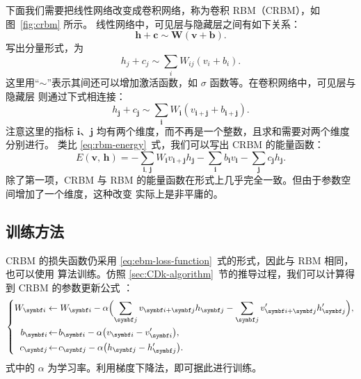 下面我们需要把线性网络改变成卷积网络，称为卷积 RBM（CRBM），如图~\ref{fig:crbm} 所示。
线性网络中，可见层与隐藏层之间有如下关系：
\begin{equation}
  \bm{h}+\bm{c} \sim \bm{W} (\bm{v}+\bm{b}).
\end{equation}
写出分量形式，为
\begin{equation}
  h_j+c_j \sim \sum_i W_{ij} (v_i+b_i).
\end{equation}
这里用“$\sim$”表示其间还可以增加激活函数，如 $\sigma$ 函数等。在卷积网络中，可见层与隐藏层
则通过下式相连接：
\begin{equation}
  h_{\bm{j}} + c_{\bm{j}} \sim \sum_{\bm{i}} W_{\bm{i}} (v_{\bm{i}+\bm{j}} + b_{\bm{i}+\bm{j}}).
\end{equation}
注意这里的指标 $\bm{i}$、$\bm{j}$ 均有两个维度，而不再是一个整数，且求和需要对两个维度分别进行。
类比 \eqref{eq:rbm-energy}~式，我们可以写出 CRBM 的能量函数：
\begin{equation}
  E(\bm{v},\,\bm{h})
  = - \sum_{\bm{i},\,\bm{j}} W_{\bm{i}} v_{\bm{i}+\bm{j}} h_{\bm{j}}
    - \sum_{\bm{i}} b_{\bm{i}} v_{\bm{i}} - \sum_{\bm{j}} c_{\bm{j}} h_{\bm{j}}.
\end{equation}
除了第一项，CRBM 与 RBM 的能量函数在形式上几乎完全一致。但由于参数空间增加了一个维度，这种改变
实际上是非平庸的。

\subsection{训练方法}

CRBM 的损失函数仍采用 \eqref{eq:ebm-loss-function}~式的形式，因此与 RBM 相同，也可以使用 \CDk{}
算法训练。仿照 \ref{sec:CDk-algorithm}~节的推导过程，我们可以计算得到 CRBM 的参数更新公式
\cite{lee2009convolutional,lee2011unsupervised}：
\begin{equation}
  \label{eq:crbm-parameters-update}
  \left\{
  \begin{aligned}
    W_{\bm{i}}    &\gets W_{\bm{i}} - \alpha
                         \qty\Big(  \sum_{\bm{j}} v_{\bm{i}+\bm{j}} h_{\bm{j}}
                                  - \sum_{\bm{j}} v'_{\bm{i}+\bm{j}} h'_{\bm{j}}), \\
    b_{\bm{i}} \! &\gets \! b_{\bm{i}} - \alpha \qty\big(v_{\bm{i}} - v'_{\bm{i}}),   \\
    c_{\bm{j}} \! &\gets \! c_{\bm{j}} - \alpha \qty\big(h_{\bm{j}} - h'_{\bm{j}}).
  \end{aligned}
  \right.
\end{equation}
式中的 $\alpha$ 为学习率。利用梯度下降法，即可据此进行训练。

